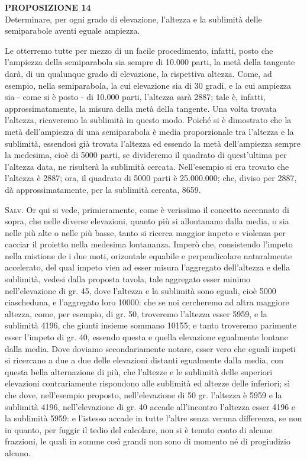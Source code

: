 \documentclass[11pt,twoside,openany]{book}
\newcommand{\speaker}[1]{\textcolor{rubric}{\textsc{#1}}\space}
\begin{document}
\textbf{PROPOSIZIONE 14}\\ Determinare, per ogni grado di elevazione, l'altezza e la sublimità delle semiparabole aventi eguale ampiezza.

Le otterremo tutte per mezzo di un facile procedimento, infatti, posto che l'ampiezza della semiparabola sia sempre di 10.000 parti, la metà della tangente darà, di un qualunque grado di elevazione, la rispettiva altezza. Come, ad esempio, nella semiparabola, la cui elevazione sia di 30 gradi, e la cui ampiezza sia - come si è posto - di 10.000 parti, l'altezza sarà 2887; tale è, infatti, approssimatamente, la misura della metà della tangente. Una volta trovata l'altezza, ricaveremo la sublimità in questo modo. Poiché si è dimostrato che la metà dell'ampiezza di una semiparabola è media proporzionale tra l'altezza e la sublimità, essendosi già trovata l'altezza ed essendo la metà dell'ampiezza sempre la medesima, cioè di 5000 parti, se divideremo il quadrato di quest'ultima per l'altezza data, ne risulterà la sublimità cercata. Nell'esempio si era trovato che l'altezza è 2887; ora, il quadrato di 5000 parti è 25.000.000; che, diviso per 2887, dà approssimatamente, per la sublimità cercata, 8659.

\speaker{Salv.} Or qui si vede, primieramente, come è verissimo il concetto accennato di sopra, che nelle diverse elevazioni, quanto più si allontanano dalla media, o sia nelle più alte o nelle più basse, tanto si ricerca maggior impeto e violenza per cacciar il proietto nella medesima lontananza. Imperò che, consistendo l'impeto nella mistione de i due moti, orizontale equabile e perpendicolare naturalmente accelerato, del qual impeto vien ad esser misura l'aggregato dell'altezza e della sublimità, vedesi dalla proposta tavola, tale aggregato esser minimo nell'elevazione di gr. 45, dove l'altezza e la sublimità sono eguali, cioè 5000 ciascheduna, e l'aggregato loro 10000: che se noi cercheremo ad altra maggiore altezza, come, per esempio, di gr. 50, troveremo l'altezza esser 5959, e la sublimità 4196, che giunti insieme sommano 10155; e tanto troveremo parimente esser l'impeto di gr. 40, essendo questa e quella elevazione egualmente lontane dalla media. Dove doviamo secondariamente notare, esser vero che eguali impeti si ricercano a due a due delle elevazioni distanti egualmente dalla media, con questa bella alternazione di più, che l'altezze e le sublimità delle superiori elevazioni contrariamente rispondono alle sublimità ed altezze delle inferiori; sì che dove, nell'esempio proposto, nell'elevazione di 50 gr. l'altezza è 5959 e la sublimità 4196, nell'elevazione di gr. 40 accade all'incontro l'altezza esser 4196 e la sublimità 5959: e l'istesso accade in tutte l'altre senza veruna differenza, se non in quanto, per fuggir il tedio del calcolare, non si è tenuto conto di alcune frazzioni, le quali in somme così grandi non sono di momento né di progiudizio alcuno.
\end{document}
